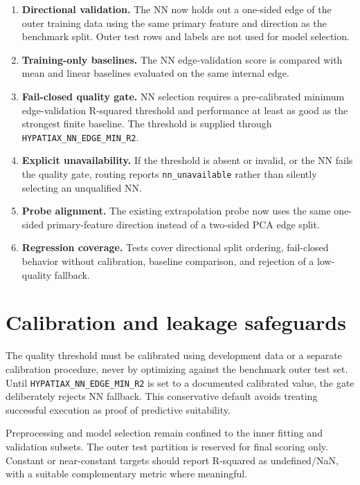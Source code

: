 \documentclass[11pt,a4paper]{article}
\begin{document}
\begin{enumerate}[leftmargin=*]
\item \textbf{Directional validation.} The NN now holds out a one-sided edge of the outer training data using the same primary feature and direction as the benchmark split. Outer test rows and labels are not used for model selection.
\item \textbf{Training-only baselines.} The NN edge-validation score is compared with mean and linear baselines evaluated on the same internal edge.
\item \textbf{Fail-closed quality gate.} NN selection requires a pre-calibrated minimum edge-validation R-squared threshold and performance at least as good as the strongest finite baseline. The threshold is supplied through \texttt{HYPATIAX\_NN\_EDGE\_MIN\_R2}.
\item \textbf{Explicit unavailability.} If the threshold is absent or invalid, or the NN fails the quality gate, routing reports \texttt{nn\_unavailable} rather than silently selecting an unqualified NN.
\item \textbf{Probe alignment.} The existing extrapolation probe now uses the same one-sided primary-feature direction instead of a two-sided PCA edge split.
\item \textbf{Regression coverage.} Tests cover directional split ordering, fail-closed behavior without calibration, baseline comparison, and rejection of a low-quality fallback.
\end{enumerate}

\section{Calibration and leakage safeguards}
The quality threshold must be calibrated using development data or a separate calibration procedure, never by optimizing against the benchmark outer test set. Until \texttt{HYPATIAX\_NN\_EDGE\_MIN\_R2} is set to a documented calibrated value, the gate deliberately rejects NN fallback. This conservative default avoids treating successful execution as proof of predictive suitability.

Preprocessing and model selection remain confined to the inner fitting and validation subsets. The outer test partition is reserved for final scoring only. Constant or near-constant targets should report R-squared as undefined/NaN, with a suitable complementary metric where meaningful.
\end{document}
